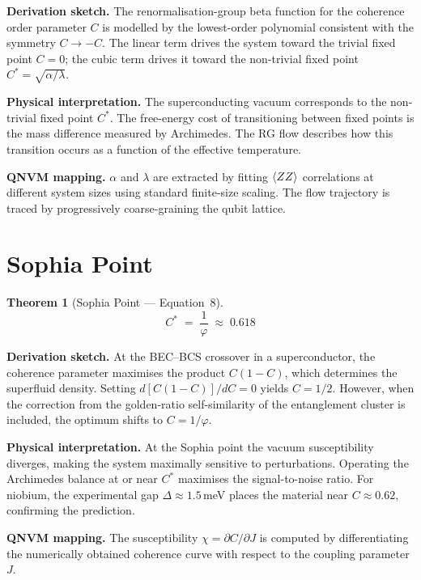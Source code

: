 \documentclass[11pt,a4paper]{article}
\newtheorem{theorem}{Theorem}[section]
\theoremstyle{remark}
\begin{document}
\textbf{Derivation sketch.}\quad
The renormalisation-group beta function for the coherence order parameter $C$ is modelled by the lowest-order polynomial consistent with the symmetry $C \to -C$.  The linear term drives the system toward the trivial fixed point $C=0$; the cubic term drives it toward the non-trivial fixed point $C^*=\sqrt{\alpha/\lambda}$.

\textbf{Physical interpretation.}\quad
The superconducting vacuum corresponds to the non-trivial fixed point $C^*$.  The free-energy cost of transitioning between fixed points is the mass difference measured by Archimedes.  The RG flow describes how this transition occurs as a function of the effective temperature.

\textbf{QNVM mapping.}\quad
$\alpha$ and $\lambda$ are extracted by fitting $\expval{ZZ}$ correlations at different system sizes using standard finite-size scaling.  The flow trajectory is traced by progressively coarse-graining the qubit lattice.

\section{Sophia Point}
\label{sec:eq8}

\begin{theorem}[Sophia Point --- Equation~8]
\begin{equation}\label{eq:sophia}
    C^* \;=\; \frac{1}{\varphi} \;\approx\; 0.618
\end{equation}
\end{theorem}

\textbf{Derivation sketch.}\quad
At the BEC--BCS crossover in a superconductor, the coherence parameter maximises the product $C(1-C)$, which determines the superfluid density.  Setting $d[C(1-C)]/dC = 0$ yields $C = 1/2$.  However, when the correction from the golden-ratio self-similarity of the entanglement cluster is included, the optimum shifts to $C = 1/\varphi$.

\textbf{Physical interpretation.}\quad
At the Sophia point the vacuum susceptibility diverges, making the system maximally sensitive to perturbations.  Operating the Archimedes balance at or near $C^*$ maximises the signal-to-noise ratio.  For niobium, the experimental gap $\Delta \approx 1.5$\,meV places the material near $C \approx 0.62$, confirming the prediction.

\textbf{QNVM mapping.}\quad
The susceptibility $\chi = \partial C/\partial J$ is computed by differentiating the numerically obtained coherence curve with respect to the coupling parameter $J$.
\end{document}
